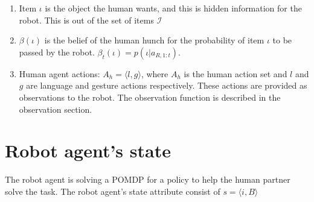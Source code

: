 \documentclass{article}
\newcommand{\myitem}{\stepcounter{enumi}\item[$*$\theenumi.]}
\begin{document}
\begin{enumerate}
	\item Item $\iota$ is the object the human wants, and this is hidden information for the robot. This is out of the set of items $\mathcal{I}$ 
	\item $\beta(\iota)$ is the belief of the human hunch for the probability of item $\iota$ to be passed by the robot. $\beta_t(\iota) = p(\iota|a_{R,1:t})$. 
	
	
	
	\item Human agent actions: $A_h = \langle l,g \rangle$, where $A_h$ is the human action set and $l$ and $g$ are language and gesture actions respectively. These actions are provided as observations to the robot. The observation function is described in the observation section.
	\end{enumerate}
	

	
	
\section{Robot agent's state	}
The robot agent is solving a POMDP for a policy to help the human partner solve the task. The robot agent's state attribute consist of $s = \langle i, B\rangle$
\end{document}
